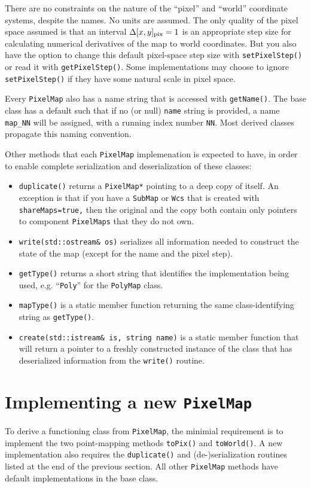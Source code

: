 \documentclass[11pt,preprint,flushrt]{aastex}
\begin{document}
There are no constraints on the nature of the ``pixel'' and ``world'' coordinate systems, despite the names.  No units are assumed.  The only quality of the pixel space assumed is that an interval $\Delta [x,y]_{\rm pix}=1$ is an appropriate step size for calculating numerical derivatives of the map to world coordinates.  But you also have the option to change this default pixel-space step size with {\tt setPixelStep()} or read it with {\tt getPixelStep()}.  Some implementations may choose to ignore {\tt setPixelStep()} if they have some natural scale in pixel space.

Every {\tt PixelMap} also has a name string that is accessed with {\tt getName()}.  The base class has a default such that if no (or null) {\tt name} string is provided, a name {\tt map\_NN} will be assigned, with a running index number  {\tt NN}.  Most derived classes propagate this naming convention.

Other methods that each {\tt PixelMap} implemenation is expected to have, in order to enable complete serialization and deserialization of these classes:
\begin{itemize}
\item {\tt duplicate()} returns a {\tt PixelMap*} pointing to a deep copy of itself. An exception is that if you have a {\tt SubMap} or {\tt Wcs} that is created with {\tt shareMaps=true,} then the original and the copy both contain only pointers to component {\tt PixelMaps} that they do not own.
\item {\tt write(std::ostream\& os)} serializes all information needed to construct the state of the map (except for the name and the pixel step).
\item {\tt getType()} returns a short string that identifies the implementation being used, e.g. ``{\tt Poly}'' for the {\tt PolyMap} class.
\item {\tt mapType()} is a static member function returning the same class-identifying string as {\tt getType()}.
\item {\tt create(std::istream\& is, string name)} is a static member function that will return a pointer to a freshly constructed instance of the class that has deserialized information from the {\tt write()} routine.  
\end{itemize}

\section{Implementing a new {\tt PixelMap}}
To derive a functioning class from {\tt PixelMap}, the minimial requirement is to implement the two point-mapping methods {\tt toPix()} and {\tt toWorld()}.  A new implementation also requires the {\tt duplicate()} and (de-)serialization routines listed at the end of the previous section.  All other {\tt PixelMap} methods have default implementations in the base class.
\end{document}
